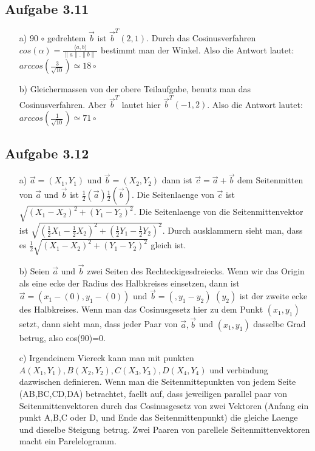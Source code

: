 \documentclass{standalone}
\begin{document}
\subsection{Aufgabe 3.11}
\begin{enumerate}[a)]
    \item[a)] 90 $\circ$  gedrehtem $\vec{b}$ ist   $\vec{b}^{T}(2,1)$. Durch das Cosinusverfahren $cos( \alpha)= \frac{\langle a,b \rangle}{  \parallel a  \parallel  .   \parallel b \parallel  \ }$   bestimmt man der Winkel. Also die Antwort lautet: $arccos(\frac{3}{\sqrt{10}}) \simeq 18 \circ$ 
    \item[b)] Gleichermassen von der obere Teilaufgabe, benutz man das Cosinusverfahren. Aber $\vec{b}^{T}$ lautet hier $\vec{b}^{T}(-1,2)$. Also die Antwort lautet: $arccos(\frac{1}{\sqrt{10}}) \simeq 71 \circ$ 
\end{enumerate}

\subsection{Aufgabe 3.12}
\begin{enumerate}[a)]
    \item[a)]$\vec{a}= (X_1,Y_1)$ und $\vec{b}=(X_2,Y_2)$ dann ist $\vec{c}= \vec{a}+\vec{b}$ dem Seitenmitten von $\vec{a}$ und $\vec{b}$ ist $\frac{1}{2}( \vec{a})  \frac{1}{2}( \vec{b})$. Die Seitenlaenge von $\vec{c}$ ist  $ \sqrt{ (X_1-X_2)^2 + (Y_1-Y_2)^2} $. Die Seitenlaenge von die Seitenmittenvektor ist   $\sqrt{ (\frac{1}{2}X_1-\frac{1}{2}X_2)^2 + (\frac{1}{2}Y_1-\frac{1}{2}Y_2)^2}$. Durch ausklammern sieht man, dass es $\frac{1}{2}\sqrt{ (X_1-X_2)^2 + (Y_1-Y_2)^2}$ gleich ist.
    \item[b)] Seien  $\vec{a}$ und  $\vec{b}$ zwei Seiten des Rechteckigesdreiecks. Wenn wir das Origin als eine ecke der Radius des Halbkreises einsetzen, dann ist   $\vec{a}=(x_1-(0),y_1-(0))$ und  $\vec{b}=(,y_1-y_2)$ $(y_2)$ ist der zweite ecke des Halbkreises. Wenn man das Cosinusgesetz hier zu dem Punkt $(x_1,y_1)$ setzt, dann sieht man, dass jeder Paar von  $\vec{a},  \vec{b}$ und $(x_1,y_1)$ dasselbe Grad betrug, also cos(90)=0.
    \item[c)] Irgendeinem Viereck kann man mit punkten $A(X_1,Y_1),B(X_2,Y_2),C(X_3,Y_3),D(X_4,Y_4)$ und verbindung dazwischen definieren. Wenn man die Seitenmittepunkten von jedem Seite (AB,BC,CD,DA) betrachtet, faellt auf, dass jeweiligen parallel paar von Seitenmittenvektoren durch das Cosinusgesetz von zwei Vektoren (Anfang ein punkt A,B,C oder D, und Ende das Seitenmittenpunkt) die gleiche Laenge und dieselbe Steigung betrug. Zwei Paaren von parellele Seitenmittenvektoren macht ein Parelelogramm.   
\end{enumerate}
\end{document}
